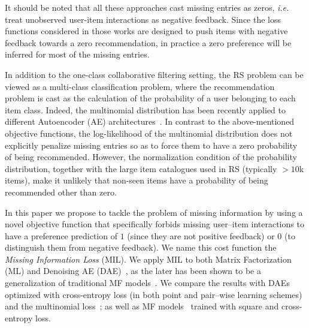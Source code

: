 It should be noted that all these approaches cast missing entries as zeros, \emph{i.e.} treat unobserved user-item interactions as negative feedback. Since the loss functions considered in those works are designed to push items with negative feedback towards a zero recommendation, in practice  a zero preference will be inferred for most of the missing entries. 

In addition to the one-class collaborative filtering setting, the RS problem can be viewed as a multi-class classification problem, where the recommendation problem is cast as the calculation of the probability of a user belonging to each item class. Indeed, the multinomial distribution has been recently applied to different Autoencoder (AE) architectures~\cite{liang:2018:VAE}. In contrast to the above-mentioned objective functions, the log-likelihood of the multinomial distribution does not explicitly penalize missing entries so as to force them to have a zero probability of being recommended. However, the normalization condition of the probability distribution, together with the large item catalogues used in RS (typically  $>10$k items), make it unlikely that non-seen items have a probability of being recommended other than zero.

In this paper we propose to tackle the problem of missing information by using a novel objective function that specifically forbids missing user--item interactions to have a preference prediction of $1$ (since they are not positive feedback) or $0$ (to distinguish them from negative feedback).  We name this cost function the \emph{Missing Information Loss} (MIL).
We apply MIL to both Matrix Factorization (ML) and Denoising AE (DAE)~\cite{Vincent:2008:ECRF-AE}, as the later has been shown to be a generalization of traditional MF models~\cite{Wu:2016:CDAE-topN}. We compare the results with DAEs optimized with cross-entropy loss (in both point and pair--wise learning schemes)~\cite{Wu:2016:CDAE-topN} and the multinomial loss~\cite{liang:2018:VAE}; as well as MF models~\cite{HuKoren:2008:CF_implicit} trained with square and cross-entropy loss. 

